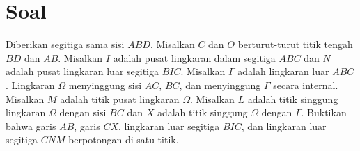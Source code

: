 \section{Soal}
Diberikan segitiga sama sisi $ABD$. Misalkan $C$ dan $O$ berturut-turut titik tengah $BD$ dan $AB$. Misalkan $I$ adalah pusat lingkaran dalam segitiga $ABC$ dan $N$ adalah pusat lingkaran luar segitiga $BIC$. Misalkan $\Gamma$ adalah lingkaran luar $ABC$. Lingkaran $\Omega$ menyinggung sisi $AC$, $BC$, dan menyinggung $\Gamma$ secara internal. Misalkan $M$ adalah titik pusat lingkaran $\Omega$. Misalkan $L$ adalah titik singgung lingkaran $\Omega$ dengan sisi $BC$ dan $X$ adalah titik singgung $\Omega$ dengan $\Gamma$. Buktikan bahwa garis $AB$, garis $CX$, lingkaran luar segitiga $BIC$, dan lingkaran luar segitiga $CNM$ berpotongan di satu titik.

